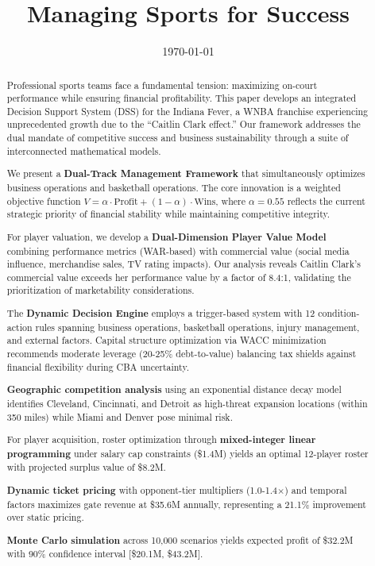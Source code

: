 \documentclass{mcmthesis}
\title{Managing Sports for Success}
\date{\today}
\begin{document}
\begin{abstract}

Professional sports teams face a fundamental tension: maximizing on-court performance while ensuring financial profitability. This paper develops an integrated Decision Support System (DSS) for the Indiana Fever, a WNBA franchise experiencing unprecedented growth due to the ``Caitlin Clark effect.'' Our framework addresses the dual mandate of competitive success and business sustainability through a suite of interconnected mathematical models.

We present a \textbf{Dual-Track Management Framework} that simultaneously optimizes business operations and basketball operations. The core innovation is a weighted objective function $V = \alpha \cdot \text{Profit} + (1-\alpha) \cdot \text{Wins}$, where $\alpha = 0.55$ reflects the current strategic priority of financial stability while maintaining competitive integrity.

For player valuation, we develop a \textbf{Dual-Dimension Player Value Model} combining performance metrics (WAR-based) with commercial value (social media influence, merchandise sales, TV rating impacts). Our analysis reveals Caitlin Clark's commercial value exceeds her performance value by a factor of 8.4:1, validating the prioritization of marketability considerations.

The \textbf{Dynamic Decision Engine} employs a trigger-based system with 12 condition-action rules spanning business operations, basketball operations, injury management, and external factors. Capital structure optimization via WACC minimization recommends moderate leverage (20-25\% debt-to-value) balancing tax shields against financial flexibility during CBA uncertainty.

\textbf{Geographic competition analysis} using an exponential distance decay model identifies Cleveland, Cincinnati, and Detroit as high-threat expansion locations (within 350 miles) while Miami and Denver pose minimal risk.

For player acquisition, roster optimization through \textbf{mixed-integer linear programming} under salary cap constraints (\$1.4M) yields an optimal 12-player roster with projected surplus value of \$8.2M.

\textbf{Dynamic ticket pricing} with opponent-tier multipliers (1.0-1.4$\times$) and temporal factors maximizes gate revenue at \$35.6M annually, representing a 21.1\% improvement over static pricing.

\textbf{Monte Carlo simulation} across 10,000 scenarios yields expected profit of \$32.2M with 90\% confidence interval [\$20.1M, \$43.2M].


\end{abstract}
\end{document}
